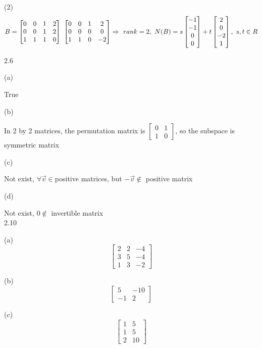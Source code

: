 \documentclass[a4paper,12pt]{article}
\begin{document}
(2)
\[
B=\begin{bmatrix} 0 & 0 & 1 & 2 \\ 0 & 0 & 1 & 2 \\ 1 & 1 & 1 & 0 \end{bmatrix} ~ \begin{bmatrix} 0 & 0 & 1 & 2 \\ 0 & 0 & 0 & 0 \\ 1 & 1 & 0 & -2 \end{bmatrix} \Rightarrow ~ rank=2, ~
N(B)=s \begin{bmatrix} -1 \\ -1 \\ 0 \\ 0 \end{bmatrix} + t \begin{bmatrix} 2 \\ 0 \\ -2 \\ 1 \end{bmatrix},~ s,t \in R \\
\]

2.6

(a)

True

(b)

In 2 by 2 matrices, the permutation matrix is $\begin{bmatrix} 0 & 1 \\ 1 & 0 \end{bmatrix}$,
so the subspace is symmetric matrix


(c)

Not exist, $\forall \vec v \in$positive matrices, but $- \vec v \notin$ positive matrix 

(d)

Not exist, $ 0 \notin $ invertible matrix \\


2.10

(a)
\[
\begin{bmatrix} 2 & 2 & -4 \\ 3 & 5 & -4 \\ 1 & 3 & -2 \end{bmatrix}
\]

(b)
\[
\begin{bmatrix} 5 & -10 \\ -1 & 2 \end{bmatrix}
\]

(c)
\[
\begin{bmatrix} 1 & 5 \\ 1 & 5 \\ 2 & 10 \end{bmatrix}
\]
\end{document}
